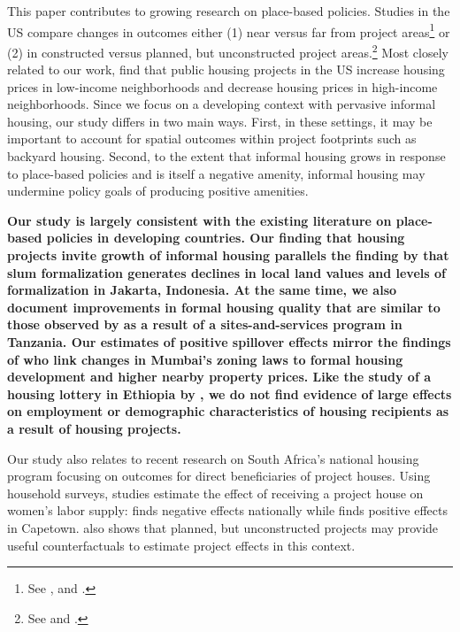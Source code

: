\documentclass[12pt]{article}
\newcommand{\rv}{}
\newcommand{\rw}{\textbf}
\begin{document}
This paper contributes to growing research on place-based policies.  Studies in the US compare changes in outcomes either (1) near versus far from project areas\footnote{See \cite{rossi2010housing,hornbeck2017creative}, and \cite{diamond2019wants}.} or (2) in constructed versus planned, but unconstructed project areas.\footnote{See \cite{busso2013assessing} and \cite{kline2013local}.}  Most closely related to our work, \cite{diamond2019wants} find that public housing projects in the US increase housing prices in low-income neighborhoods and decrease housing prices in high-income neighborhoods.  \rv{Since we focus on a developing context with pervasive informal housing, our study differs in two main ways.  First, in these settings, it may be important to account for spatial outcomes within project footprints such as backyard housing.  Second, to the extent that informal housing grows in response to place-based policies and is itself a negative amenity, informal housing may undermine policy goals of producing positive amenities.}

\rw{Our study is largely consistent with the existing literature on place-based policies in developing countries.  Our finding that housing projects invite growth of informal housing parallels the finding by \cite{harari2018slum} that slum formalization generates declines in local land values and levels of formalization in Jakarta, Indonesia.  At the same time, we also document improvements in formal housing quality that are similar to those observed by \cite{michaels2021planning} as a result of a sites-and-services program in Tanzania.  Our estimates of positive spillover effects mirror the findings of \cite{gechter2020spatial} who link changes in Mumbai's zoning laws to formal housing development and higher nearby property prices. Like the study of a housing lottery in Ethiopia by \cite{franklin2019demand}, we do not find evidence of large effects on employment or demographic characteristics of housing recipients as a result of housing projects.}


Our study also relates to recent research on South Africa's national housing program focusing on outcomes for direct beneficiaries of project houses.  Using household surveys, studies estimate the effect of receiving a project house on women's labor supply: \cite{picarelli2019there}  finds negative effects nationally while \cite{franklin2020enabled} finds positive effects in Capetown.  \cite{franklin2020enabled} also shows that planned, but unconstructed projects may provide useful counterfactuals to estimate project effects in this context.
\end{document}
